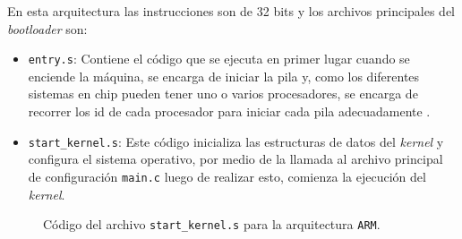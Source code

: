 	\newpage
	
	En esta arquitectura las instrucciones son de 32 bits y los archivos principales del \textit{bootloader} son:
	\begin{itemize} \setlength\itemsep{0pt}
		\item \texttt{entry.s}: Contiene el código que se ejecuta en primer lugar cuando se enciende la máquina, se encarga de iniciar la pila y, como los diferentes sistemas en chip pueden tener uno o varios procesadores, se encarga de recorrer los id de cada procesador para iniciar cada pila adecuadamente .
		\item \texttt{start\_kernel.s}: Este código inicializa las estructuras de datos del \textit{kernel} y configura el sistema operativo, por medio de la llamada al archivo principal de configuración \texttt{main.c} luego de realizar esto, comienza la ejecución del \textit{kernel}.
	\end{itemize}
	\begin{figure}[ht]
		\centering
		\hspace*{1cm}
		\caption{
			Código del archivo \texttt{start\_kernel.s} para la arquitectura \texttt{ARM}.
			\label{fig:arm_startkernels}
		}
	\end{figure}


